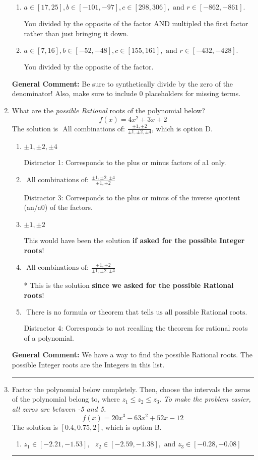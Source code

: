 \documentclass{extbook}[14pt]
\newcommand{\litem}[1]{\item #1

\rule{\textwidth}{0.4pt}}
\begin{document}
\begin{enumerate}
{\begin{enumerate}[label=\Alph*.]
 You multipled by the synthetic number rather than bringing the first factor down.
\item \( a \in [17, 25], b \in [-101, -97], c \in [298, 306], \text{ and } r \in [-862, -861]. \)

 You divided by the opposite of the factor AND multipled the first factor rather than just bringing it down.
\item \( a \in [7, 16], b \in [-52, -48], c \in [155, 161], \text{ and } r \in [-432, -428]. \)

 You divided by the opposite of the factor.
\end{enumerate}

\textbf{General Comment:} Be sure to synthetically divide by the zero of the denominator! Also, make sure to include 0 placeholders for missing terms.
}
\litem{
What are the \textit{possible Rational} roots of the polynomial below?
\[ f(x) = 4x^{2} +3 x + 2 \]The solution is \( \text{ All combinations of: }\frac{\pm 1,\pm 2}{\pm 1,\pm 2,\pm 4} \), which is option D.\begin{enumerate}[label=\Alph*.]
\item \( \pm 1,\pm 2,\pm 4 \)

 Distractor 1: Corresponds to the plus or minus factors of a1 only.
\item \( \text{ All combinations of: }\frac{\pm 1,\pm 2,\pm 4}{\pm 1,\pm 2} \)

 Distractor 3: Corresponds to the plus or minus of the inverse quotient (an/a0) of the factors. 
\item \( \pm 1,\pm 2 \)

This would have been the solution \textbf{if asked for the possible Integer roots}!
\item \( \text{ All combinations of: }\frac{\pm 1,\pm 2}{\pm 1,\pm 2,\pm 4} \)

* This is the solution \textbf{since we asked for the possible Rational roots}!
\item \( \text{ There is no formula or theorem that tells us all possible Rational roots.} \)

 Distractor 4: Corresponds to not recalling the theorem for rational roots of a polynomial.
\end{enumerate}

\textbf{General Comment:} We have a way to find the possible Rational roots. The possible Integer roots are the Integers in this list.
}
\litem{
Factor the polynomial below completely. Then, choose the intervals the zeros of the polynomial belong to, where $z_1 \leq z_2 \leq z_3$. \textit{To make the problem easier, all zeros are between -5 and 5.}
\[ f(x) = 20x^{3} -63 x^{2} +52 x -12 \]The solution is \( [0.4, 0.75, 2] \), which is option B.\begin{enumerate}[label=\Alph*.]
\item \( z_1 \in [-2.21, -1.53], \text{   }  z_2 \in [-2.59, -1.38], \text{   and   } z_3 \in [-0.28, -0.08] \)


\end{enumerate}}
\end{enumerate}
\end{document}
